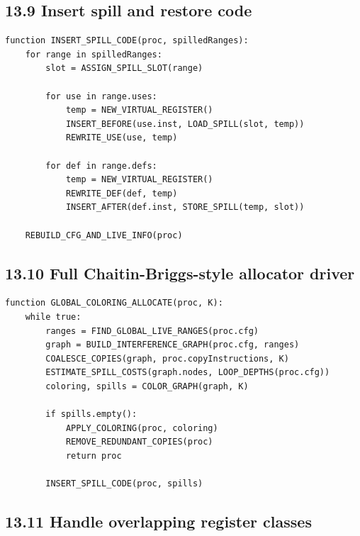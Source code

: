\documentclass[10pt,letterpaper]{article}
\begin{document}
\subsection*{13.9 Insert spill and restore code}
{}

\begin{verbatim}
function INSERT_SPILL_CODE(proc, spilledRanges):
    for range in spilledRanges:
        slot = ASSIGN_SPILL_SLOT(range)

        for use in range.uses:
            temp = NEW_VIRTUAL_REGISTER()
            INSERT_BEFORE(use.inst, LOAD_SPILL(slot, temp))
            REWRITE_USE(use, temp)

        for def in range.defs:
            temp = NEW_VIRTUAL_REGISTER()
            REWRITE_DEF(def, temp)
            INSERT_AFTER(def.inst, STORE_SPILL(temp, slot))

    REBUILD_CFG_AND_LIVE_INFO(proc)
\end{verbatim}

\subsection*{13.10 Full Chaitin-Briggs-style allocator driver}
{}

\begin{verbatim}
function GLOBAL_COLORING_ALLOCATE(proc, K):
    while true:
        ranges = FIND_GLOBAL_LIVE_RANGES(proc.cfg)
        graph = BUILD_INTERFERENCE_GRAPH(proc.cfg, ranges)
        COALESCE_COPIES(graph, proc.copyInstructions, K)
        ESTIMATE_SPILL_COSTS(graph.nodes, LOOP_DEPTHS(proc.cfg))
        coloring, spills = COLOR_GRAPH(graph, K)

        if spills.empty():
            APPLY_COLORING(proc, coloring)
            REMOVE_REDUNDANT_COPIES(proc)
            return proc

        INSERT_SPILL_CODE(proc, spills)
\end{verbatim}

\subsection*{13.11 Handle overlapping register classes}
{}
\end{document}
